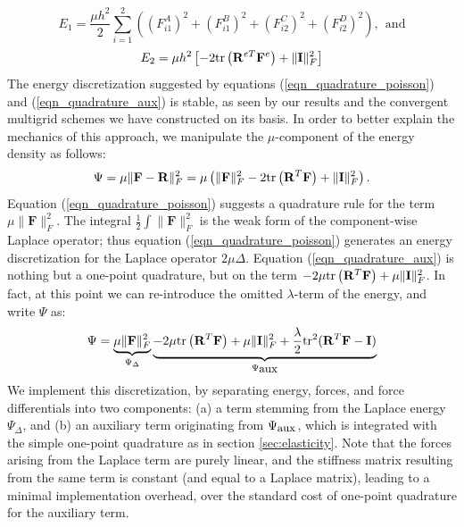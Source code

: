 \begin{equation}
E_1=\frac{\mu h^2}{2}\sum_{i=1}^2\left((F_{i1}^A)^2\!+\!(F_{i1}^B)^2\!+\!(F_{i2}^C)^2\!+\!(F_{i2}^D)^2\right),\ \ \mbox{and}
\label{eqn_quadrature_poisson}
\end{equation}
\begin{equation}
E_2=\mu h^2\left[-2\mbox{tr}\left(\mathbf{R}^{eT}\mathbf{F}^e\right)+\|\mathbf{I}\|_F^2\right]
\label{eqn_quadrature_aux}
\end{equation}
The energy discretization suggested by equations (\ref{eqn_quadrature_poisson}) and (\ref{eqn_quadrature_aux}) is stable, as seen by our results and the convergent multigrid schemes
we have constructed on its basis. In order to better explain the
mechanics of this approach, we manipulate the $\mu$-component of the
energy density as follows:
$$
\Psi=\mu\|\mathbf{F}-\mathbf{R}\|_F^2=\mu\left(\|\mathbf{F}\|_F^2-2\mbox{tr}\left(\mathbf{R}^T\mathbf{F}\right)+\|\mathbf{I}\|_F^2\right).
$$
Equation (\ref{eqn_quadrature_poisson}) suggests a quadrature rule for the term $\mu\|\mathbf{F}\|_F^2$. The integral $\frac{1}{2}\int\|\mathbf{F}\|_F^2$ is the weak form of the
component-wise Laplace operator; thus equation (\ref{eqn_quadrature_poisson}) generates an energy discretization for the Laplace operator $2\mu\Delta$. Equation
(\ref{eqn_quadrature_aux}) is nothing but a one-point quadrature, but on the term $-2\mu\mbox{tr}\left(\mathbf{R}^T\mathbf{F}\right)+\mu\|\mathbf{I}\|_F^2$. In fact, at this point we can
re-introduce the omitted $\lambda$-term of the energy, and write $\Psi$ as:
\begin{equation}
\Psi=\underbrace{\mu\|\mathbf{F}\|_F^2}_{\Psi_\Delta}
\underbrace{-2\mu\mbox{tr}\left(\mathbf{R}^T\mathbf{F}\right)+\mu\|\mathbf{I}\|_F^2+\frac{\lambda}{2}\mbox{tr}^2(\mathbf{R}^T\mathbf{F}-\mathbf{I})}_{\Psi_{\mbox{\small aux}}}
\label{eqn_psi_poisson_and_aux}
\end{equation}
We implement this discretization, by separating energy, forces, and force differentials into two components: (a) a term stemming from the Laplace energy $\Psi_\Delta$, and (b) an
auxiliary term originating from $\Psi_{\mbox{\small aux}}$, which is integrated with the simple one-point quadrature as in section \ref{sec:elasticity}. Note that the forces arising from
the Laplace term are purely linear, and the stiffness matrix resulting from the same term is constant (and equal to a Laplace matrix), leading to a minimal implementation overhead, over
the standard cost of one-point quadrature for the auxiliary term. 

